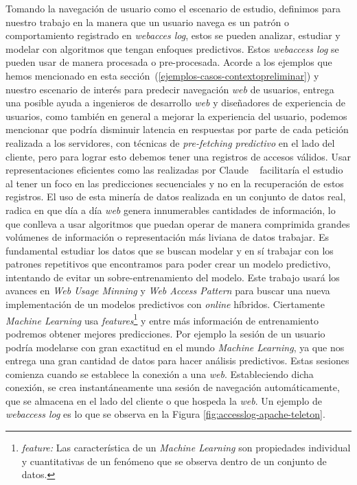 	Tomando la navegación de usuario como el escenario de estudio, definimos para nuestro trabajo en la manera que un usuario navega es un patrón o comportamiento registrado en \emph{webacces log}, estos se pueden analizar, estudiar y modelar con algoritmos que tengan enfoques predictivos. Estos \emph{webaccess log} se pueden usar de manera procesada o pre-procesada. Acorde a los ejemplos que hemos mencionado en esta sección~(\ref{ejemplos-casos-contextopreliminar})  y nuestro escenario de interés para predecir navegación \emph{web} de usuarios, entrega una posible ayuda a ingenieros de desarrollo \emph{web} y diseñadores de experiencia de usuarios, como también en general a mejorar la experiencia del usuario, podemos mencionar que podría disminuir latencia en respuestas por parte de cada petición realizada a los servidores, con técnicas de \emph{pre-fetching predictivo} en el lado del cliente, pero para lograr esto debemos tener una registros de accesos válidos. Usar representaciones eficientes como las realizadas por Claude \etal~\cite{Claude2014} facilitaría el estudio al tener un foco en las predicciones secuenciales y no en la recuperación de estos registros. El uso de esta  minería de datos realizada en un conjunto de datos real, radica en que día a día \emph{web} genera  innumerables cantidades de información, lo que conlleva a usar algoritmos que puedan operar de manera comprimida grandes volúmenes de información o representación más liviana de datos trabajar. Es fundamental estudiar los datos que se buscan modelar y en sí trabajar con los patrones repetitivos que encontramos para poder crear un modelo predictivo, intentando de evitar un sobre-entrenamiento del modelo. Este trabajo usará los avances en \emph{Web Usage Minning} y \emph{Web Access Pattern} para buscar una nueva implementación de un modelos predictivos con  \emph{online} híbridos. Ciertamente \emph{Machine Learning} usa \emph{features}\footnote{\emph{feature:} Las característica de un \emph{Machine Learning} son propiedades individual y cuantitativas de un fenómeno que se observa dentro de un conjunto de datos.} y entre más información de entrenamiento podremos  obtener mejores predicciones. Por ejemplo la sesión de un usuario podría modelarse con gran exactitud en el mundo \emph{Machine Learning}, ya que nos entrega una gran cantidad de datos para hacer análisis predictivos. Estas sesiones comienza cuando se establece la conexión a una \emph{web}. Estableciendo dicha conexión, se crea instantáneamente una sesión de navegación automáticamente, que se almacena en el lado del cliente o que hospeda la \emph{web}. Un ejemplo de \emph{webaccess log} es lo que se observa en la Figura \ref{fig:accesslog-apache-teleton}.



